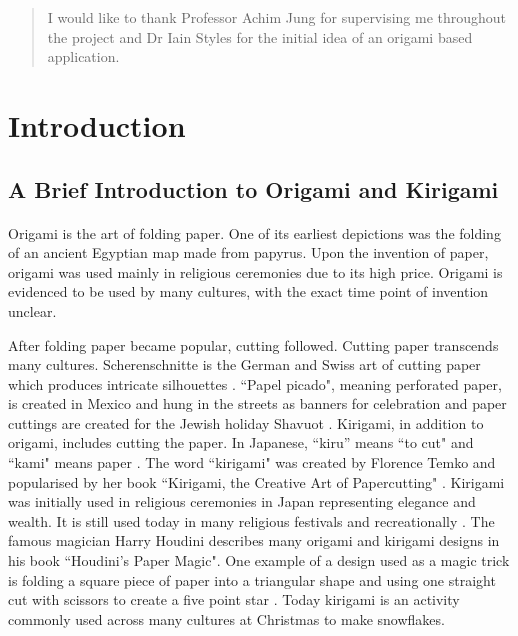\documentclass[11pt]{article}
\begin{document}
\vspace{50pt}
\renewcommand{\abstractname}{Acknowledgements}
\begin{abstract}
    I would like to thank Professor Achim Jung for supervising me throughout the project and Dr Iain Styles for the initial idea of an origami based application. 
\end{abstract}

\newpage

\section{Introduction}

        \subsection{A Brief Introduction to Origami and Kirigami}
        
            \paragraph{}
            Origami is the art of folding paper. One of its earliest depictions was the folding of an ancient Egyptian map made from papyrus. Upon the invention of paper, origami was used mainly in religious ceremonies due to its high price. Origami is evidenced to be used by many cultures, with the exact time point of invention unclear.\cite{origamiBible}
            
            After folding paper became popular, cutting followed. Cutting paper transcends many cultures. Scherenschnitte is the German and Swiss art of cutting paper which produces intricate silhouettes \cite{Scherenschnitt}. ``Papel picado", meaning perforated paper, is created in Mexico and hung in the streets as banners for celebration \cite{GlobalPaperCutting} and paper cuttings are created for the Jewish holiday Shavuot \cite{CJNews}. Kirigami, in addition to origami, includes cutting the paper. In Japanese, ``kiru'' means ``to cut" \cite{Temko2004kirigami} and ``kami" means paper \cite{WordHippo}. The word ``kirigami" was created by Florence Temko and popularised by her book ``Kirigami, the Creative Art of Papercutting" \cite{OrigamiResourceCenter}. Kirigami was initially used in religious ceremonies in Japan representing elegance and wealth. It is still used today in many religious festivals and recreationally \cite{kyuhoshiInfo}. The famous magician Harry Houdini describes many origami and kirigami designs in his book ``Houdini’s Paper Magic". One example of a design used as a magic trick is folding a square piece of paper into a triangular shape and using one straight cut with scissors to create a five point star \cite{PaperMagic}. Today kirigami is an activity commonly used across many cultures at Christmas to make snowflakes.
            
\end{document}
